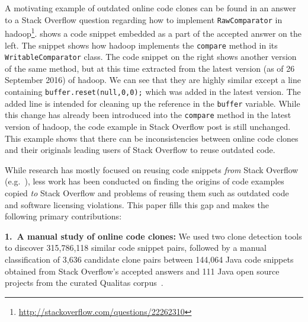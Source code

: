 \documentclass[sigconf,review, anonymous]{acmart}
\begin{document}
A motivating example of outdated online code clones can be found in an
answer to a Stack Overflow question regarding how to implement
{\small{\texttt{RawComparator}}} in
\textsf{hadoop}\footnote{\url{http://stackoverflow.com/questions/22262310}}.
 shows a code snippet embedded as a part of the
accepted answer on the left. The snippet shows how \textsf{hadoop}
implements the {\small{\texttt{compare}}} method in its
{\small{\texttt{WritableComparator}}} class. The code snippet on the
right shows another version of the same method, but at this time
extracted from the latest version (as of 26 September 2016) of
\textsf{hadoop}. We can see that they are highly similar except a line
containing {\small{\verb|buffer.reset(null,0,0);|}} which was added in
the latest version. The added line is intended for cleaning up the
reference in the {\small{\verb|buffer|}} variable. While this change
has already been introduced into the {\small{\texttt{compare}}} method
in the latest version of \textsf{hadoop}, the code example in Stack
Overflow post is still unchanged. This example shows that there can be
inconsistencies between online code clones and their originals leading
users of Stack Overflow to reuse outdated code.

While research has mostly focused on reusing code snippets \emph{from}
Stack Overflow (e.g.~\cite{Keivanloo2014,An2017,Yang2016}), less work
has been conducted on finding the origins of code examples copied
\emph{to} Stack Overflow and problems of reusing them such as outdated
code and software licensing violations. This paper fills this gap and
makes the following primary contributions:

\vspace{0.5ex}%
\noindent\textbf{1.~A manual study of online code clones:} 
We used two clone detection tools to discover 315,786,118 similar code
snippet pairs, followed by a manual classification of 3,636 candidate
clone pairs between 144,064 Java code snippets obtained from Stack Overflow's
accepted answers and 111 Java open source projects from the curated
Qualitas corpus~\cite{QualitasCorpus}.
\end{document}
